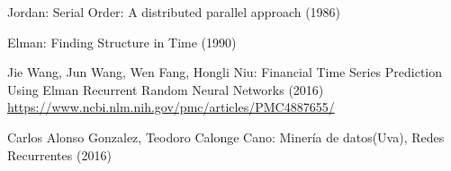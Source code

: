 \documentclass[10pt, a4paper,spanish]{article}
\begin{document}
  \begin{thebibliography}{9}

    	Jordan: Serial Order: A distributed parallel approach (1986)

    	Elman: Finding Structure in Time (1990)

    	Jie Wang, Jun Wang, Wen Fang, Hongli Niu: Financial Time Series Prediction Using Elman Recurrent Random Neural Networks (2016) \url{https://www.ncbi.nlm.nih.gov/pmc/articles/PMC4887655/}

			Carlos Alonso Gonzalez, Teodoro Calonge Cano: Minería de datos(Uva), Redes Recurrentes (2016)
	\end{thebibliography}
\end{document}
